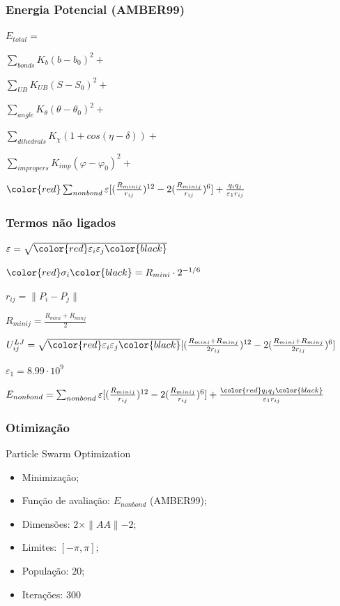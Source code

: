 \documentclass{beamer}
\begin{document}
\begin{frame}
\frametitle{Energia Potencial (AMBER99)}
$E_{total} = $

$\sum_{bonds} K_{b}(b - b_0)^2 + $

$\sum_{UB} K_{UB}(S - S_0)^2 + $

$\sum_{angle} K_{\theta}(\theta - \theta_0)^2 + $

$\sum_{dihedrals} K_{\chi}(1 + cos(\eta - \delta)) + $

$\sum_{impropers} K_{imp}(\varphi - \varphi_0)^2 + $

$\color{red}\sum_{nonbond} \varepsilon [(\frac{R_{minij}}{r_{ij}})^{12} -2(\frac{R_{minij}}{r_{ij}})^6] + \frac{q_i q_j}{\varepsilon_1 r_{ij}} $
\end{frame}

\begin{frame}
\frametitle{Termos não ligados}
$\varepsilon = \sqrt{ \color{red} \varepsilon_i \varepsilon_j \color{black} }$

$\color{red}\sigma_i \color{black} = R_{mini} \cdot 2^{-1/6}$

$r_{ij} = \parallel P_i - P_j \parallel$

$R_{minij} = \frac{R_{mini} + R_{minj}}{2}$

$U^{LJ}_{ij} = \sqrt{ \color{red} \varepsilon_i \varepsilon_j \color{black} } [(\frac{R_{mini} + R_{minj}}{2r_{ij}})^{12} -2(\frac{R_{mini} + R_{minj}}{2r_{ij}})^{6}]$

$\varepsilon_1 = 8.99 \cdot 10^9$

$E_{nonbond} = \sum_{nonbond} \varepsilon [(\frac{R_{minij}}{r_{ij}})^{12} -2(\frac{R_{minij}}{r_{ij}})^6] + \frac{\color{red}q_i q_j \color{black}}{\varepsilon_1 r_{ij}}$
\end{frame}

\begin{frame}
\frametitle{Otimização}
Particle Swarm Optimization
\begin{itemize}
  \item Minimização;
  \item Função de avaliação: $E_{nonbond}$ (AMBER99);
  \item Dimensões: $2 \times \parallel AA \parallel - 2$;
  \item Limites: $[-\pi, \pi]$;
  \item População: $20$;
  \item Iterações: $300$
\end{itemize}
\end{frame}
\end{document}
